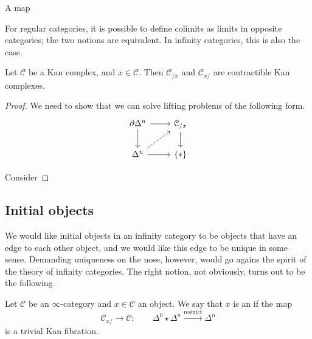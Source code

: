 \documentclass[main.tex]{subfiles}
\begin{document}
\begin{corollary}
  A map
\end{corollary}

For regular categories, it is possible to define colimits as limits in opposite categories; the two notions are equivalent. In infinity categories, this is also the case.

\begin{lemma}
  \label{lemma:under_over_categories_of_kan_complex_are_contractible}
  Let $\mathcal{C}$ be a Kan complex, and $x \in \mathcal{C}$. Then $\mathcal{C}_{/x}$ and $\mathcal{C}_{x/}$ are contractible Kan complexes.
\end{lemma}
\begin{proof}
  We need to show that we can solve lifting problems of the following form.
  \begin{equation*}
    \begin{tikzcd}
      \partial \Delta^{n}
      \arrow[r]
      \arrow[d]
      & \mathcal{C}_{/x}
      \arrow[d]
      \\
      \Delta^{n}
      \arrow[r]
      \arrow[ur, dashed]
      & \{*\}
    \end{tikzcd}
  \end{equation*}

  Consider
\end{proof}

\subsection{Initial objects}
\label{ssc:initial_objects}

We would like initial objects in an infinity category to be objects that have an edge to each other object, and we would like this edge to be unique in some sense. Demanding uniqueness on the nose, however, would go agains the spirit of the theory of infinity categories. The right notion, not obviously, turns out to be the following.

\begin{definition}
  \label{def:initial_object}
  Let $\mathcal{C}$ be an $\infty$-category and $x \in \mathcal{C}$ an object. We say that $x$ is an  if the map
  \begin{equation*}
    \mathcal{C}_{x/} \to \mathcal{C};\qquad \Delta^{0} \star \Delta^{n} \overset{\text{restrict}}{\to} \Delta^{n}
  \end{equation*}
  is a trivial Kan fibration.
\end{definition}
\end{document}

